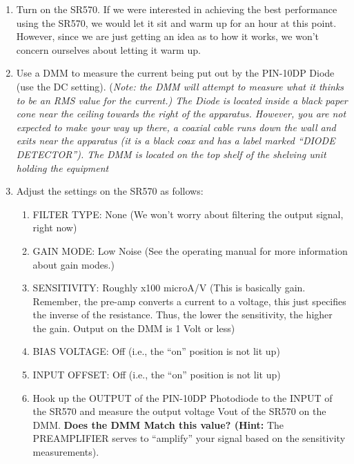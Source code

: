 \documentclass{../lab}
\begin{document}
\begin{enumerate}
    \item Turn on the SR570. If we were interested in achieving the best performance using the SR570, we would let it sit and warm up for an hour at this point. However, since we are just getting an idea as to how it works, we won't concern ourselves about letting it warm up.

    \item Use a DMM to measure the current being put out by the PIN-10DP Diode (use the DC setting). (\emph{Note: the DMM will attempt to measure what it thinks to be an RMS value for the current.) The Diode is located inside a black paper cone near the ceiling towards the right of the apparatus. However, you are not expected to make your way up there, a coaxial cable runs down the wall and exits near the apparatus (it is a black coax and has a label marked ``DIODE DETECTOR''). The DMM is located on the top shelf of the shelving unit holding the equipment}

    \item Adjust the settings on the SR570 as follows:
    \begin{enumerate}
        \item FILTER TYPE: None (We won't worry about filtering the output signal, right now)

        \item GAIN MODE: Low Noise (See the operating manual for more information about gain modes.)

        \item SENSITIVITY: Roughly x100 microA/V (This is basically gain. Remember, the pre-amp converts a current to a voltage, this just specifies the inverse of the resistance. Thus, the lower the sensitivity, the higher the gain. Output on the DMM is 1 Volt or less)

        \item BIAS VOLTAGE: Off (i.e., the ``on'' position is not lit up)

        \item INPUT OFFSET: Off (i.e., the ``on'' position is not lit up)

        \item Hook up the OUTPUT of the PIN-10DP Photodiode to the INPUT of the SR570 and measure the output voltage Vout of the SR570 on the DMM. \textbf{Does the DMM Match this value? (Hint: }The PREAMPLIFIER serves to ``amplify'' your signal based on the sensitivity measurements).

    \end{enumerate}

\end{enumerate}
\end{document}
